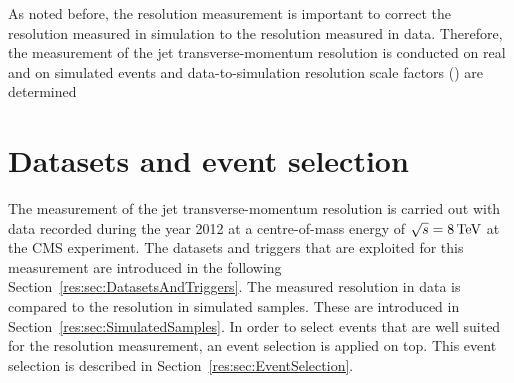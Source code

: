 As noted before, the resolution measurement is important to correct the resolution measured in simulation to the resolution measured in data.
Therefore, the measurement of the jet transverse-momentum resolution is conducted on real and on simulated events and data-to-simulation resolution scale factors (\rhores) are determined
\FloatBarrier
\chapter{Datasets and event selection}

The measurement of the jet transverse-momentum resolution is carried out with \GAMJET data recorded during the year 2012 at a centre-of-mass energy of $\sqrt{s}=8\,\text{Te}\kern-0.06667em\text{V}$ at the CMS experiment.
The datasets and triggers that are exploited for this measurement are introduced in the following Section~\ref{res:sec:DatasetsAndTriggers}.
The measured resolution in data is compared to the resolution in simulated samples. These are introduced in Section~\ref{res:sec:SimulatedSamples}.
In order to select \GAMJET events that are well suited for the resolution measurement, an event selection is applied on top.
This event selection is described in Section~\ref{res:sec:EventSelection}.

